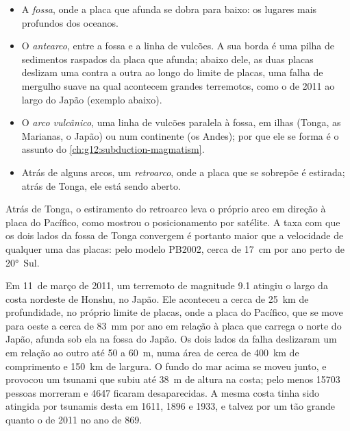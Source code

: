 \begin{itemize}
  \item A \emph{fossa}, onde a placa que afunda se dobra para baixo: os
        lugares mais profundos dos oceanos.
  \item O \emph{antearco}, entre a fossa e a linha de vulcões. A sua borda é
        uma pilha de sedimentos raspados da placa que afunda; abaixo dele, as
        duas placas deslizam uma contra a outra ao longo do limite de placas,
        uma falha de mergulho suave na qual acontecem grandes terremotos,
        como o de 2011 ao largo do Japão (exemplo abaixo).
  \item O \emph{arco vulcânico}, uma linha de vulcões paralela à fossa, em
        ilhas (Tonga, as Marianas, o Japão) ou num continente (os Andes); por
        que ele se forma é o assunto do \cref{ch:g12:subduction-magmatism}.
  \item Atrás de alguns arcos, um \emph{retroarco}, onde a placa que se
        sobrepõe é estirada; atrás de Tonga, ele está sendo aberto.
\end{itemize}

Atrás de Tonga, o estiramento do retroarco leva o próprio arco em direção à
placa do Pacífico, como mostrou o posicionamento por satélite. A taxa com que os dois lados da fossa de Tonga convergem
é portanto maior que a velocidade de qualquer uma das placas: pelo modelo
PB2002, cerca de \qty{17}{cm} por ano perto de \ang{20}~Sul.

\begin{example}\label{ex:g11:subduction-zones:tohoku}
Em 11~de março de 2011, um terremoto de magnitude 9.1 atingiu o largo da
costa nordeste de Honshu, no Japão. Ele aconteceu a cerca de \qty{25}{km} de
profundidade, no próprio limite de placas, onde a placa do Pacífico, que se
move para oeste a cerca de \qty{83}{mm} por ano em relação à placa que
carrega o norte do Japão, afunda sob ela na fossa do Japão. Os dois lados da
falha deslizaram um em relação ao outro até 50 a \qty{60}{m}, numa área de
cerca de \qty{400}{km} de comprimento e \qty{150}{km} de largura. O fundo do
mar acima se moveu junto, e provocou um tsunami que subiu até \qty{38}{m} de
altura na costa; pelo menos \num{15703} pessoas morreram e \num{4647} ficaram
desaparecidas. A mesma costa tinha sido atingida por tsunamis desta  em 1611, 1896 e 1933, e talvez por um tão grande quanto o de 2011
no ano de 869.
\end{example}

